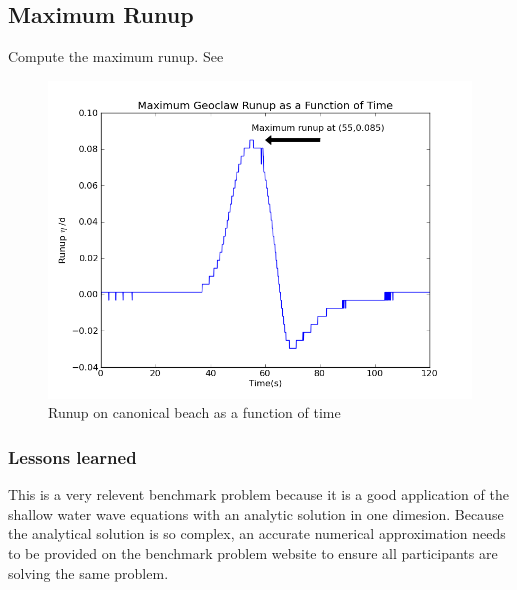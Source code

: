 \subsection{Maximum Runup}
Compute the maximum runup.
See 
\begin{figure}[ht]
\hfil\includegraphics[width=5.5in]{bp1/runup.png}\hfil
\caption{\label{fig:bp1runup} 
Runup on canonical beach as a function of time}
\end{figure}

\subsubsection{Lessons learned}

This is a very relevent benchmark problem because it is a good
application of the shallow water wave equations with an analytic solution
in one dimesion. Because the analytical solution is so complex, an accurate
numerical approximation needs to be provided on the benchmark problem
website to ensure all participants are solving the same problem.

